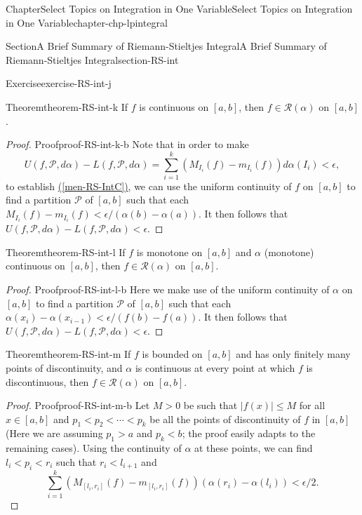 \documentclass[oneside,10pt,]{book}
\newcommand{\xreffont}{\relax}
\numberwithin{equation}{section}
\newcommand{\cP}{\mathcal{P}}
\newcommand{\cR}{\mathcal{R}}
\begin{document}
\begin{chapterptx}{Chapter}{Select Topics on Integration in One Variable}{}{Select Topics on Integration in One Variable}{}{}{chapter-chp-lpintegral}
\begin{sectionptx}{Section}{A Brief Summary of Riemann-Stieltjes Integral}{}{A Brief Summary of Riemann-Stieltjes Integral}{}{}{section-RS-int}
\begin{inlineexercise}{Exercise}{}{exercise-RS-int-j}
\end{inlineexercise}%
\begin{theorem}{Theorem}{}{}{theorem-RS-int-k}%
If \(f\) is continuous on \([a, b]\), then \(f\in \cR (\alpha)\) on \([a, b]\).\end{theorem}
\begin{proof}{Proof}{}{proof-RS-int-k-b}
Note that in order to make%
\begin{equation*}
U(f, \cP, d \alpha)  -L(f, \cP, d \alpha) 
=\sum_{i=1}^{k}\left( M_{I_{i}} (f) -m_{I_{i}} (f)\right) d\alpha (I_{i}) < \epsilon,
\end{equation*}
to establish \hyperref[men-RS-IntC]{({\xreffont\ref{men-RS-IntC}})}, we can use the uniform continuity of \(f\) on \([a, b]\) to find a partition \(\cP\) of \([a, b]\) such that each \(M_{I_{i}} (f) -m_{I_{i}} (f) < \epsilon/(\alpha(b)-\alpha(a))\). It then follows that \(U(f, \cP, d \alpha)  -L(f, \cP, d \alpha) < \epsilon\).\end{proof}
\begin{theorem}{Theorem}{}{}{theorem-RS-int-l}%
If \(f\) is monotone on \([a, b]\) and \(\alpha\) (monotone) continuous on \([a, b]\), then \(f\in \cR (\alpha)\) on \([a, b]\).\end{theorem}
\begin{proof}{Proof}{}{proof-RS-int-l-b}
Here we make use of the uniform continuity of \(\alpha\) on \([a, b]\) to find a partition \(\cP\) of \([a, b]\) such that  each \(\alpha(x_{i})-\alpha(x_{i-1}) < \epsilon/(f(b)-f(a))\). It then follows that \(U(f, \cP, d \alpha)  -L(f, \cP, d \alpha) < \epsilon\).\end{proof}
\begin{theorem}{Theorem}{}{}{theorem-RS-int-m}%
If \(f\) is bounded on \([a, b]\) and has only finitely many points of discontinuity, and \(\alpha\) is continuous at every point at which \(f\) is discontinuous, then \(f\in \cR (\alpha)\) on \([a, b]\).\end{theorem}
\begin{proof}{Proof}{}{proof-RS-int-m-b}
Let \(M > 0\) be such that \(|f(x)| \le M\) for all \(x\in [a, b]\) and \(p_{1} < p_{2} < \cdots < p_{k}\) be all the points of discontinuity of \(f\) in \([a, b]\) (Here we are assuming \(p_{1} > a\) and \(p_{k} < b\); the proof easily adapts to the remaining cases). Using the continuity of \(\alpha\) at these points, we can find \(l_{i} < p_{i} < r_{i}\) such that \(r_{i} < l_{i+1}\) and%
\begin{equation*}
\sum_{i=1}^{k}\left(M_{[l_{i}, r_{i}]}(f)- m_{[l_{i}, r_{i}]}(f)\right)(\alpha(r_{i})-\alpha(l_{i})) < \epsilon/2.

\end{equation*}
\end{proof}
\end{sectionptx}
\end{chapterptx}
\end{document}
